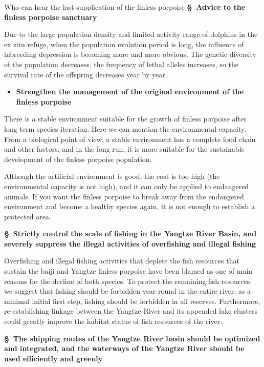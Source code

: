 \documentclass[12pt]{article}  %
\begin{document}
\begin{letter}{Who can hear the last supplication of the finless porpoise}
\noindent%
\textbf{\S  \ Advice to the finless porpoise sanctuary }
 
 Due to the large population density and limited activity range of dolphins in the ex situ refuge, when the population evolution period is long, the influence of inbreeding depression is becoming more and more obvious. The genetic diversity of the population decreases, the frequency of lethal alleles increases, so the survival rate of the offspring decreases year by year. 
 


 \begin{itemize}
    \item  \textbf{Strengthen the management of the original environment of the finless porpoise}
 \end{itemize}
 
 
 There is a stable environment suitable for the growth of finless porpoise after long-term species iteration. Here we can mention the environmental capacity. From a biological point of view, a stable environment has a complete food chain and other factors, and in the long run, it is more suitable for the sustainable development of the finless porpoise population. 
 
 Although the artificial environment is good, the cost is too high (the environmental capacity is not high), and it can only be applied to endangered animals. If you want the finless porpoise to break away from the endangered environment and become a healthy species again, it is not enough to establish a protected area. 
 
 \noindent%
\textbf{\S  \ Strictly control the scale of fishing in the Yangtze River Basin, and severely suppress the illegal activities of overfishing and illegal fishing }

 
 Overfishing and illegal fishing activities that deplete the fish resources that sustain the baiji and Yangtze finless porpoise have been blamed as one of main reasons for the decline of both species. To protect the remaining fish resources, we suggest that fishing should be forbidden year-round in the entire river; as a minimal initial first step, fishing should be forbidden in all reserves. Furthermore, re-establishing linkage between the Yangtze River and its appended lake clusters could greatly improve the habitat status of fish resources of the river.
 
\noindent%
\textbf{\S  \ The shipping routes of the Yangtze River basin should be optimized and integrated, and the waterways of the Yangtze River should be used efficiently and greenly }


\end{letter}
\end{document}

